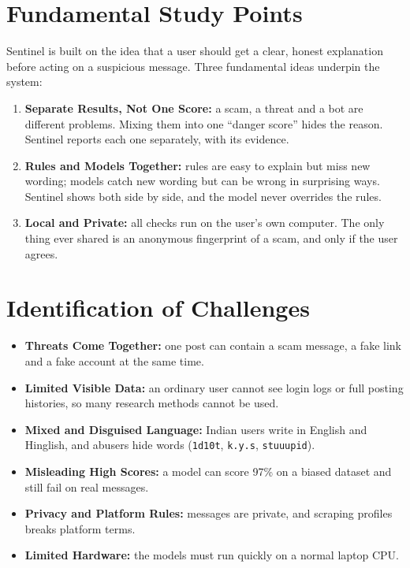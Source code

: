 \section{Fundamental Study Points}
\noindent Sentinel is built on the idea that a user should get a clear, honest explanation before acting on a suspicious message. Three fundamental ideas underpin the system:
\begin{enumerate}
\item \textbf{Separate Results, Not One Score:} a scam, a threat and a bot are different problems. Mixing them into one ``danger score'' hides the reason. Sentinel reports each one separately, with its evidence.
\item \textbf{Rules and Models Together:} rules are easy to explain but miss new wording; models catch new wording but can be wrong in surprising ways. Sentinel shows both side by side, and the model never overrides the rules.
\item \textbf{Local and Private:} all checks run on the user's own computer. The only thing ever shared is an anonymous fingerprint of a scam, and only if the user agrees.
\end{enumerate}

\section{Identification of Challenges}
\begin{itemize}
\item \textbf{Threats Come Together:} one post can contain a scam message, a fake link and a fake account at the same time.
\item \textbf{Limited Visible Data:} an ordinary user cannot see login logs or full posting histories, so many research methods \cite{lit2} cannot be used.
\item \textbf{Mixed and Disguised Language:} Indian users write in English and Hinglish, and abusers hide words (\texttt{1d10t}, \texttt{k.y.s}, \texttt{stuuupid}).
\item \textbf{Misleading High Scores:} a model can score 97\% on a biased dataset and still fail on real messages.
\item \textbf{Privacy and Platform Rules:} messages are private, and scraping profiles breaks platform terms.
\item \textbf{Limited Hardware:} the models must run quickly on a normal laptop CPU.
\end{itemize}

